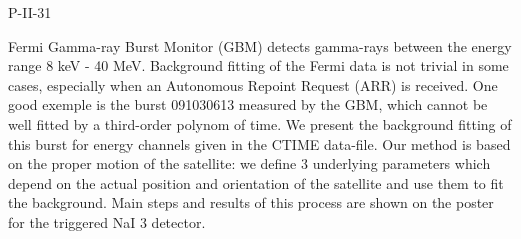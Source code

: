 P-II-31


\bigskip



\bigskip

\noindent Fermi Gamma-ray Burst Monitor (GBM) detects gamma-rays between the
energy range 8 keV - 40 MeV. Background fitting of the Fermi data is
not trivial in some cases, especially when an Autonomous Repoint
Request (ARR) is received. One good exemple is the burst 091030613
measured by the GBM, which cannot be well fitted by a third-order
polynom of time. We present the background fitting of this burst for
energy channels given in the CTIME data-file. Our method is based on
the proper motion of the satellite: we define 3 underlying parameters
which depend on the actual position and orientation of the satellite
and use them to fit the background. Main steps and results of this
process are shown on the poster for the triggered NaI 3 detector.

